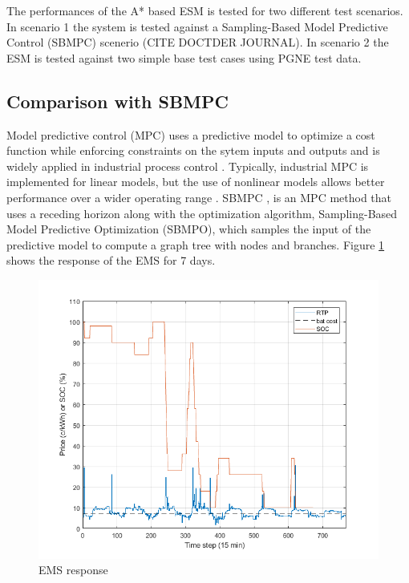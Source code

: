 The performances of the A* based ESM is tested for two different test scenarios. In scenario 1 the system is tested against a Sampling-Based Model Predictive Control (SBMPC) scenerio (CITE DOCTDER JOURNAL). In scenario 2 the ESM is tested against two simple base test cases using PGNE test data.

\subsection{Comparison with SBMPC}
 Model predictive control (MPC) uses a predictive model to optimize a cost function while enforcing constraints on the sytem inputs and outputs and is widely applied in industrial process control \cite{qin1997overview}. Typically, industrial MPC is implemented for linear models, but the use of nonlinear models allows better performance over a wider operating range \cite{berber2012nonlinear}. SBMPC \cite{dunlap2011book}, \cite{reese2016graph} is an MPC method that uses a receding horizon along with the optimization algorithm, Sampling-Based Model Predictive Optimization (SBMPO), which samples the input of the predictive model to compute a  graph tree with nodes and branches. Figure \ref{fig:EMS_7_7days} shows the response of the EMS for 7 days.
 
 \begin{figure}[!ht]
    \centering
    \includegraphics[width = \linewidth]{figs/Plot100_7.png}
    \caption{EMS response}
    \label{fig:EMS_7_7days}
\end{figure}

